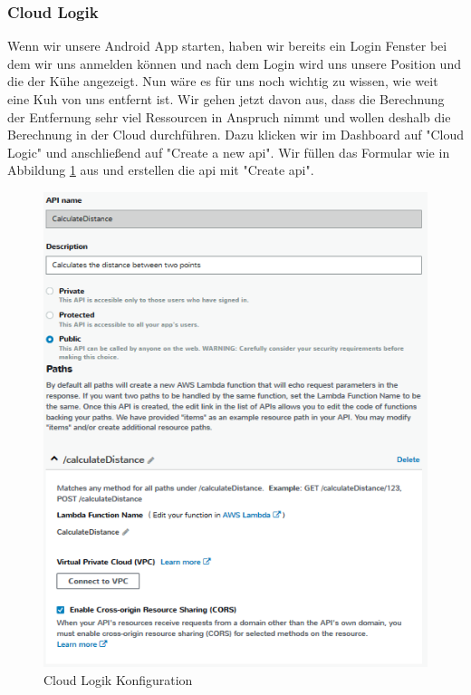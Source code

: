 \subsubsection{Cloud Logik}
Wenn wir unsere Android App starten, haben wir bereits ein Login Fenster bei dem wir uns anmelden können und nach dem Login wird uns unsere Position und die der Kühe angezeigt. Nun wäre es für uns noch wichtig zu wissen, wie weit eine Kuh von uns entfernt ist. Wir gehen jetzt davon aus, dass die Berechnung der Entfernung sehr viel Ressourcen in Anspruch nimmt und wollen deshalb die Berechnung in der Cloud durchführen. Dazu klicken wir im Dashboard auf "Cloud Logic" und anschließend auf "Create a new \gls{api}". Wir füllen das Formular wie in Abbildung \ref{fig:cloudlogicsetup} aus und erstellen die \gls{api} mit "Create \gls{api}".

\begin{figure}[h!]
	\centering
	\includegraphics[width=1\linewidth]{Pictures/CloudLogicSetup}
	\caption[Cloud Logik Konfiguration]{Cloud Logik Konfiguration}
	\label{fig:cloudlogicsetup}
\end{figure}

